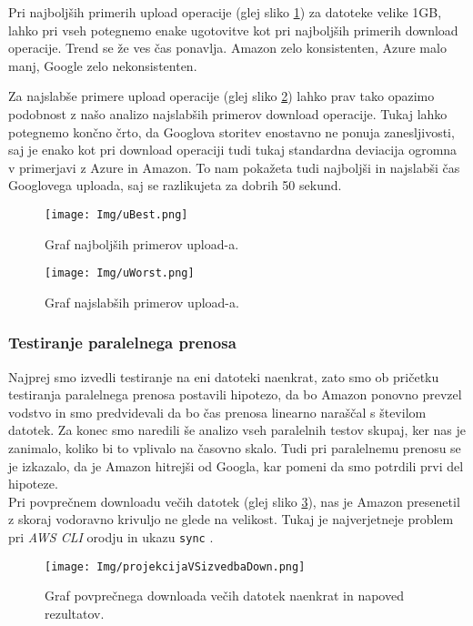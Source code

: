 \documentclass[11pt]{article}
\begin{document}
Pri najboljših primerih upload operacije (glej sliko \ref{fig:graph7}) za datoteke velike 1GB, lahko pri vseh potegnemo enake ugotovitve kot pri najboljših primerih download operacije. Trend se že ves čas ponavlja. Amazon zelo konsistenten, Azure malo manj, Google zelo nekonsistenten.

Za najslabše primere upload operacije (glej sliko \ref{fig:graph8}) lahko prav tako opazimo podobnost z našo analizo najslabših primerov download operacije. Tukaj lahko potegnemo končno črto, da Googlova storitev enostavno ne ponuja zanesljivosti, saj je enako kot pri download operaciji tudi tukaj standardna deviacija ogromna v primerjavi z Azure in Amazon. To nam pokažeta tudi najboljši in najslabši čas Googlovega uploada, saj se razlikujeta za dobrih 50 sekund.

\begin{figure}[H]
    \begin{center}
        \texttt{[image: Img/uBest.png]}
        \caption{Graf najboljših primerov upload-a.}
        \label{fig:graph7}
    \end{center}
\end{figure}
\begin{figure}[H]
    \begin{center}
        \texttt{[image: Img/uWorst.png]}
        \caption{Graf najslabših primerov upload-a.}
        \label{fig:graph8}
    \end{center}
\end{figure}

\subsubsection{Testiranje paralelnega prenosa}

Najprej smo izvedli testiranje na eni datoteki naenkrat, zato smo ob pričetku testiranja paralelnega prenosa postavili hipotezo, da bo Amazon ponovno prevzel vodstvo in smo predvidevali da bo čas prenosa linearno naraščal s številom datotek.
Za konec smo naredili še analizo vseh paralelnih testov skupaj, ker nas je zanimalo, koliko bi to vplivalo na časovno skalo. 
Tudi pri paralelnemu prenosu se je izkazalo, da je Amazon hitrejši od Googla, kar pomeni da smo potrdili prvi del hipoteze.\\

Pri povprečnem downloadu večih datotek (glej sliko \ref{fig:graph9}), nas je Amazon presenetil z skoraj vodoravno krivuljo ne glede na velikost. Tukaj je najverjetneje problem pri \textit{AWS CLI} orodju in ukazu \texttt{sync} \cite{sync}.\\
\begin{figure}[H]
    \begin{center}
        \texttt{[image: Img/projekcijaVSizvedbaDown.png]}
        \caption{Graf povprečnega downloada večih datotek naenkrat in napoved rezultatov.}
        \label{fig:graph9}
    \end{center}
\end{figure}
\end{document}
